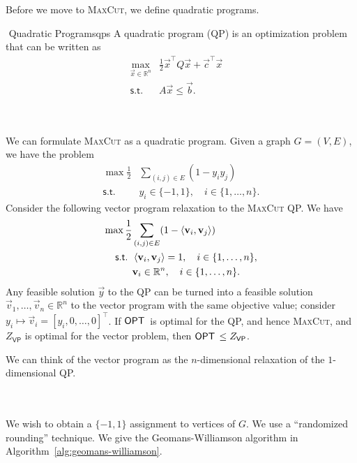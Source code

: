         Before we move to \textsc{MaxCut}, we define quadratic programs.
        \begin{definition}{\Stop\,\,Quadratic Programs}{qps}
            A quadratic program (QP) is an optimization problem that can be written as
            \begin{align*}
                \max_{\vec{x}\in\mathbb{R}^n} &\frac{1}{2}\vec{x}^\top Q\vec{x}+\vec{c}^\top\vec{x} \quad \\
                \textsf{s.t. }&A\vec{x}\leq\vec{b}.
            \end{align*}
        \end{definition}
        \vphantom
        \\
        \\
        We can formulate \textsc{MaxCut} as a quadratic program. Given a graph \(G=(V,E)\), we have the problem
        \begin{align*}
            \max\frac{1}{2}&\sum_{(i,j)\in E}(1-y_iy_j) \\
            \textsf{s.t. }&y_i\in\{-1,1\}, \quad i\in\{1,\ldots,n\}.
        \end{align*}
        Consider the following vector program relaxation to the \textsc{MaxCut} QP. We have
        \begin{align*}
            \max\frac{1}{2}&\sum_{(i,j)\in E}(1-\left\langle \mathbf{v}_i,\mathbf{v}_j\right\rangle) \\
            \textsf{s.t. }&\left\langle \mathbf{v}_i,\mathbf{v}_j\right\rangle=1, \quad i\in\{1,\ldots,n\}, \\
            &\mathbf{v}_i\in\mathbb{R}^n, \quad i\in\{1,\ldots,n\}.
        \end{align*}
        Any feasible solution \(\vec{y}\) to the QP can be turned into a feasible solution \(\vec{v}_1,\ldots,\vec{v}_n\in\mathbb{R}^n\) to the vector program with the same objective value; consider \(y_i\mapsto \vec{v}_i=[y_i,0,\ldots,0]^\top\). If \(\mathsf{OPT\,}\) is optimal for the QP, and hence \textsc{MaxCut}, and \(Z_{\mathsf{VP}}\) is optimal for the vector problem, then \(\mathsf{OPT\,}\leq Z_{\mathsf{VP}}\).
        \begin{remark*}
            We can think of the vector program as the \(n\)-dimensional relaxation of the \(1\)-dimensional QP. 
        \end{remark*}
        \vphantom
        \\
        \\
        We wish to obtain a \(\{-1,1\}\) assignment to vertices of \(G\). We use a ``randomized rounding'' technique. We give the Geomans-Williamson algorithm in Algorithm~\ref{alg:geomans-williamson}.
